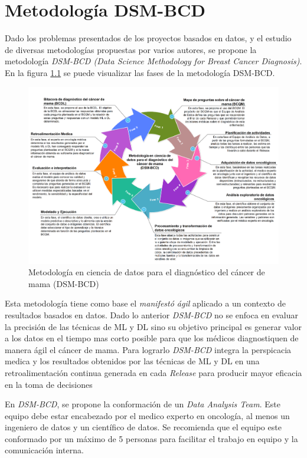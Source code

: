 \chapter{Metodología DSM-BCD}

Dado los problemas presentados de los proyectos basados en datos, y el estudio de diversas metodologías propuestas por varios autores, se propone la metodología \textit{DSM-BCD (Data Science Methodology for Breast Cancer Diagnosis)}. En la figura \ref{DSM-BCD} se puede visualizar las fases de la metodología DSM-BCD.

\begin{figure}[!htb]
	\centering
	\includegraphics[width=0.9
	\linewidth]{IMAGENES/DSM-BCD_SPANISH.pdf}
	\caption{Metodología en ciencia de datos para el diagnóstico del cáncer de mama 
		(DSM-BCD)}
	\label{DSM-BCD}
\end{figure}

Esta metodología tiene como base el \textit{manifestó ágil} aplicado a un contexto de resultados basados en datos. Dado lo anterior \textit{DSM-BCD} no se enfoca en evaluar la precisión de las técnicas de ML y DL sino su objetivo principal es generar valor a los datos en el tiempo mas corto posible para que los médicos diagnostiquen de manera ágil el cáncer de mama. Para lograrlo \textit{DSM-BCD} integra la perspicacia medica y los resultados obtenidos por las técnicas de ML y DL en una retroalimentación continua generada en cada \textit{Release} para producir mayor eficacia en la toma de decisiones

 En \textit{DSM-BCD}, se propone la conformación de un \textit{Data Analysis Team}. Este equipo debe estar encabezado por el medico experto en oncología, al menos un ingeniero de datos y un científico de datos. Se recomienda que el equipo este conformado por un máximo de 5 personas para facilitar el trabajo en equipo y la comunicación interna.
 
